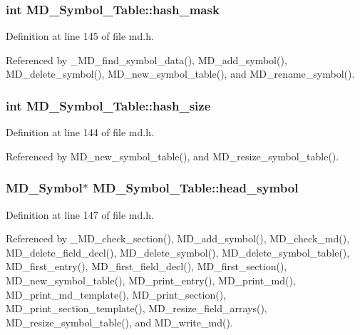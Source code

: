 \subsubsection{\setlength{\rightskip}{0pt plus 5cm}int \bf{MD\_\-Symbol\_\-Table::hash\_\-mask}}\label{structMD__Symbol__Table_5f02b9358c3cdba76127891819a12e33}




Definition at line 145 of file md.h.

Referenced by \_\-MD\_\-find\_\-symbol\_\-data(), MD\_\-add\_\-symbol(), MD\_\-delete\_\-symbol(), MD\_\-new\_\-symbol\_\-table(), and MD\_\-rename\_\-symbol().
\subsubsection{\setlength{\rightskip}{0pt plus 5cm}int \bf{MD\_\-Symbol\_\-Table::hash\_\-size}}\label{structMD__Symbol__Table_0d8078ac11123bf391f463b1efc0d9b4}




Definition at line 144 of file md.h.

Referenced by MD\_\-new\_\-symbol\_\-table(), and MD\_\-resize\_\-symbol\_\-table().
\subsubsection{\setlength{\rightskip}{0pt plus 5cm}\bf{MD\_\-Symbol}$\ast$ \bf{MD\_\-Symbol\_\-Table::head\_\-symbol}}\label{structMD__Symbol__Table_8ba4fed52bf2d15250eb28d540efcf73}




Definition at line 147 of file md.h.

Referenced by \_\-MD\_\-check\_\-section(), MD\_\-add\_\-symbol(), MD\_\-check\_\-md(), MD\_\-delete\_\-field\_\-decl(), MD\_\-delete\_\-symbol(), MD\_\-delete\_\-symbol\_\-table(), MD\_\-first\_\-entry(), MD\_\-first\_\-field\_\-decl(), MD\_\-first\_\-section(), MD\_\-new\_\-symbol\_\-table(), MD\_\-print\_\-entry(), MD\_\-print\_\-md(), MD\_\-print\_\-md\_\-template(), MD\_\-print\_\-section(), MD\_\-print\_\-section\_\-template(), MD\_\-resize\_\-field\_\-arrays(), MD\_\-resize\_\-symbol\_\-table(), and MD\_\-write\_\-md().
